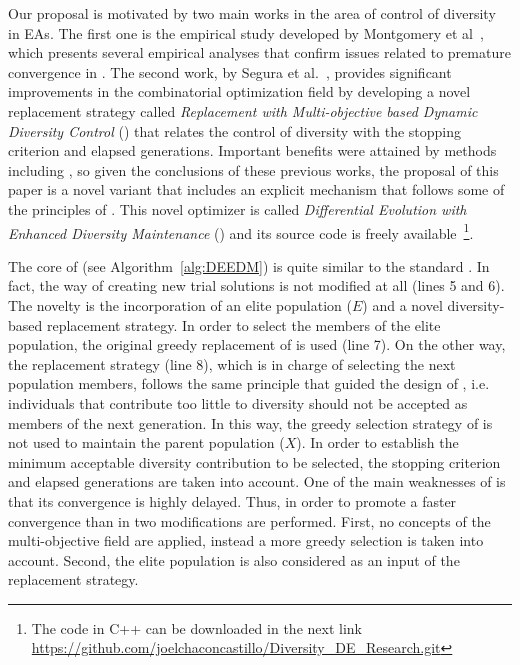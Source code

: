 Our proposal is motivated by two main works in the area of control of diversity in EAs.
%
The first one is the empirical study developed by Montgomery et al~\cite{montgomery2012simple},
which presents several empirical analyses that confirm issues related to premature convergence in \DE{}.
%
The second work, by Segura et al.~\cite{segura2016novel}, provides significant improvements in the combinatorial optimization field
by developing a novel replacement strategy called \textit{Replacement with Multi-objective based Dynamic Diversity Control} (\RMDDC{}) 
that relates the control of diversity with the stopping criterion and elapsed generations.
%
Important benefits were attained by methods including \RMDDC{}, so given the conclusions of these previous works, the proposal of this paper is a 
novel \DE{} variant that includes an explicit mechanism that follows some of the principles of \RMDDC{}.
%
This novel optimizer is called \textit{Differential Evolution with Enhanced Diversity Maintenance} (\DEEDM{}) and its source
code is freely available~\footnote{The code in C++ can be downloaded in the next link \url{https://github.com/joelchaconcastillo/Diversity\_DE\_Research.git}}.

The core of \DEEDM{} (see Algorithm~\ref{alg:DEEDM}) is quite similar to the standard \DE{}.
%
In fact, the way of creating new trial solutions is not modified at all (lines 5 and 6).
%
The novelty is the incorporation of an elite population ($E$) and a novel diversity-based replacement strategy.
%
In order to select the members of the elite population, the original greedy replacement of \DE{} is used (line 7).
%
On the other way, the replacement strategy (line 8), which is in charge of selecting the next population members,
follows the same principle that guided the 
design of \RMDDC{}, i.e. individuals that contribute too little to diversity should not be accepted as members of the next generation.
%
In this way, the greedy selection strategy of \DE{} is not used to maintain the parent population ($X$).
%
In order to establish the minimum acceptable diversity contribution to be selected, the stopping criterion and elapsed
generations are taken into account.
%
One of the main weaknesses of \RMDDC{} is that its convergence is highly delayed.
%
Thus, in order to promote a faster convergence than in \RMDDC{} two modifications are performed.
%
First, no concepts of the multi-objective field are applied, instead a more greedy selection is taken into account.
%
Second, the elite population is also considered as an input of the replacement strategy.

